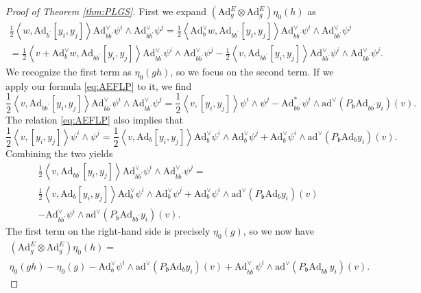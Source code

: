 \documentclass[10pt,a4paper]{amsart}
\newcommand{\Ad}{\mathrm{Ad}}
\newcommand{\ad}{\mathrm{ad}}
\newcommand{\fr}[1]{\mathfrak{#1}}
\newcommand{\ox}{\otimes}
\newcommand{\pr}{\prime}
\begin{document}
\begin{proof}[Proof of Theorem \ref{thm:PLGS}]
First we expand $\left( \Ad^{E}_g \ox \Ad^{E}_g \right) \eta_0(h)$ as
\begin{multline*}
\frac{1}{2} \left\langle w , \Ad_{b^\pr} \mathopen{}\left[ y_i , y_j \right] \right\rangle \Ad^\vee_{b b^\pr} \psi^i \wedge \Ad^\vee_{b b^\pr} \psi^j 
= \frac{1}{2} \left\langle \Ad^\vee_b w , \Ad_{b b^\pr} \mathopen{} \left[ y_i , y_j \right] \right\rangle \Ad^\vee_{b b^\pr} \psi^i \wedge \Ad^\vee_{b b^\pr} \psi^j \\
= \frac{1}{2} \left\langle v + \Ad^\vee_b w , \Ad_{b b^\pr} \mathopen{} \left[ y_i , y_j \right] \right\rangle \Ad^\vee_{b b^\pr} \psi^i \wedge \Ad^\vee_{b b^\pr} \psi^j - \frac{1}{2} \left\langle v , \Ad_{b b^\pr} \mathopen{} \left[ y_i , y_j \right] \right\rangle \Ad^\vee_{b b^\pr} \psi^i \wedge \Ad^\vee_{b b^\pr} \psi^j .
\end{multline*}
We recognize the first term as $\eta_0(g h)$, so we focus on the second term.
If we apply our formula \eqref{eq:AEFLP} to it, we find
\[
\frac{1}{2} \left\langle v , \Ad_{b b^\pr} \mathopen{} \left[ y_i , y_j \right] \right\rangle \Ad^\vee_{b b^\pr} \psi^i \wedge \Ad^\vee_{b b^\pr} \psi^j = \frac{1}{2} \left\langle v , \left[ y_i , y_j \right] \right\rangle \psi^i \wedge \psi^j - \Ad_{b b^\pr}^* \psi^i \wedge \ad^\vee ( P_{\fr{b}}\Ad_{b b^\pr} y_i ) (v).
\]
The relation \eqref{eq:AEFLP} also implies that
\[
\frac{1}{2} \left\langle v , \left[ y_i , y_j \right] \right\rangle \psi^i \wedge \psi^j = \frac{1}{2} \left\langle v , \Ad_b \mathopen{} \left[ y_i , y_j \right] \right\rangle \Ad^\vee_b \psi^i \wedge \Ad^\vee_b \psi^j + \Ad^\vee_b \psi^i \wedge \ad^\vee ( P_{\fr{b}} \Ad_b y_i ) (v) .
\]
Combining the two yields
\begin{multline*}
\frac{1}{2} \left\langle v , \Ad_{b b^\pr} \mathopen{} \left[ y_i , y_j \right] \right\rangle \Ad^\vee_{b b^\pr} \psi^i \wedge \Ad^\vee_{b b^\pr} \psi^j =\\
 \frac{1}{2} \left\langle v , \Ad_b \mathopen{} \left[ y_i , y_j \right] \right\rangle \Ad^\vee_b \psi^i \wedge \Ad^\vee_b \psi^j + \Ad^\vee_b \psi^i \wedge \ad^\vee ( P_{\fr{b}} \Ad_b y_i ) (v)\\
  - \Ad^\vee_{b b^\pr} \psi^i \wedge \ad^\vee ( P_{\fr{b}} \Ad_{b b^\pr} y_i ) (v) .
\end{multline*}
The first term on the right-hand side is precisely $\eta_0(g)$, so we now have
\begin{multline}\label{eq:g-on-eta-0-h}
\left( \Ad^{E}_g \ox \Ad^{E}_g \right) \eta_0(h) =\\
 \eta_0(g h) - \eta_0(g) - \Ad^\vee_b \psi^i \wedge \ad^\vee ( P_{\fr{b}} \Ad_b y_i ) (v) + \Ad^\vee_{b b^\pr} \psi^i \wedge \ad^\vee ( P_{\fr{b}} \Ad_{b b^\pr} y_i ) (v) .
\end{multline}


\end{proof}
\end{document}
